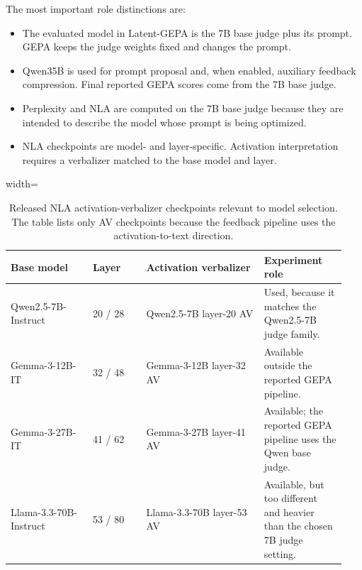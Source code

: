 \documentclass[12pt,a4paper,twoside,openright]{book}
\begin{document}
The most important role distinctions are:
\begin{itemize}
    \item The evaluated model in Latent-GEPA is the 7B base judge plus its
    prompt. GEPA keeps the judge weights fixed and changes the prompt.
    \item Qwen35B is used for prompt proposal and, when enabled, auxiliary
    feedback compression. Final reported GEPA scores come from the 7B base
    judge.
    \item Perplexity and NLA are computed on the 7B base judge because they are
    intended to describe the model whose prompt is being optimized.
    \item NLA checkpoints are model- and layer-specific. Activation
    interpretation requires a verbalizer matched to the base model and layer.
\end{itemize}

\begin{table}[!htb]
    \centering
    \scriptsize
    \begin{adjustbox}{width=\textwidth}
    \begin{tabular}{p{0.23\linewidth} p{0.15\linewidth} p{0.33\linewidth} p{0.23\linewidth}}
        \toprule
        \textbf{Base model} & \textbf{Layer} & \textbf{Activation verbalizer} & \textbf{Experiment role} \\
        \midrule
        Qwen2.5-7B-Instruct &
        20 / 28 &
        Qwen2.5-7B layer-20 AV &
        Used, because it matches the Qwen2.5-7B judge family. \\
        Gemma-3-12B-IT &
        32 / 48 &
        Gemma-3-12B layer-32 AV &
        Available outside the reported GEPA pipeline. \\
        Gemma-3-27B-IT &
        41 / 62 &
        Gemma-3-27B layer-41 AV &
        Available; the reported GEPA pipeline uses the Qwen base judge. \\
        Llama-3.3-70B-Instruct &
        53 / 80 &
        Llama-3.3-70B layer-53 AV &
        Available, but too different and heavier than the chosen 7B judge setting. \\
        \bottomrule
    \end{tabular}
    \end{adjustbox}
    \caption[Released NLA AV checkpoints.]{Released NLA activation-verbalizer checkpoints relevant to model
    selection. The table lists only AV checkpoints because the feedback pipeline
    uses the activation-to-text direction.}
    \label{tab:nla-checkpoints}
\end{table}
\end{document}
